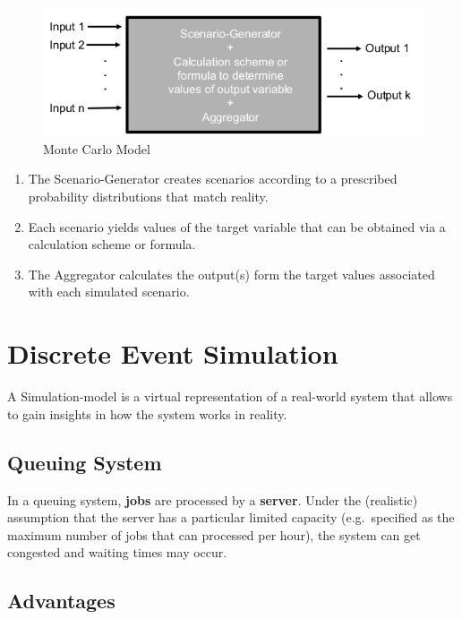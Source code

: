 \begin{figure}
\centering
\includegraphics{figures/montecarloModel.png}
\caption{Monte Carlo Model}
\end{figure}

\begin{enumerate}
\def\labelenumi{\arabic{enumi}.}
\tightlist
\item
  The Scenario-Generator creates scenarios according to a prescribed
  probability distributions that match reality.
\item
  Each scenario yields values of the target variable that can be
  obtained via a calculation scheme or formula.
\item
  The Aggregator calculates the output(s) form the target values
  associated with each simulated scenario.
\end{enumerate}

\hypertarget{discrete-event-simulation-1}{%
\section{Discrete Event Simulation}\label{discrete-event-simulation-1}}

A Simulation-model is a virtual representation of a real-world system
that allows to gain insights in how the system works in reality.

\hypertarget{queuing-system}{%
\subsection{Queuing System}\label{queuing-system}}

In a queuing system, \textbf{jobs} are processed by a \textbf{server}.
Under the (realistic) assumption that the server has a particular
limited capacity (e.g.~specified as the maximum number of jobs that can
processed per hour), the system can get congested and waiting times may
occur.

\hypertarget{advantages}{%
\subsection{Advantages}\label{advantages}}

